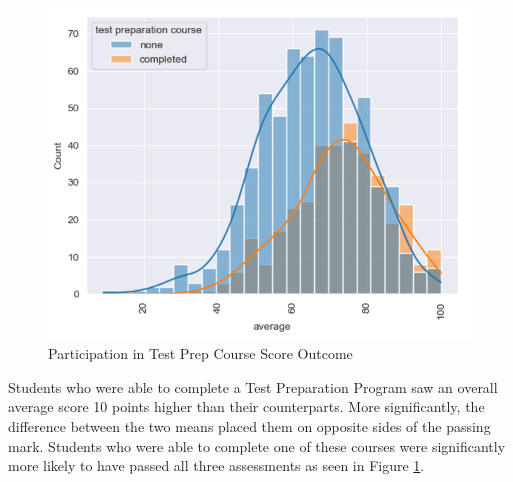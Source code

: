 \documentclass[doc]{apa6} %
\begin{document}
\begin{figure}[H]
    \centering
    \includegraphics[width=0.75\linewidth]{TestPrepOverall.png}
    \caption{Participation in Test Prep Course Score Outcome}
    \label{fig:TestPrepOverall}
\end{figure}
Students who were able to complete a Test Preparation Program saw an overall average score 10 points higher than their counterparts. More significantly, the difference between the two means placed them on opposite sides of the passing mark. Students who were able to complete one of these courses were significantly more likely to have passed all three assessments as seen in Figure \ref{fig:TestPrepOverall}.
\end{document}
